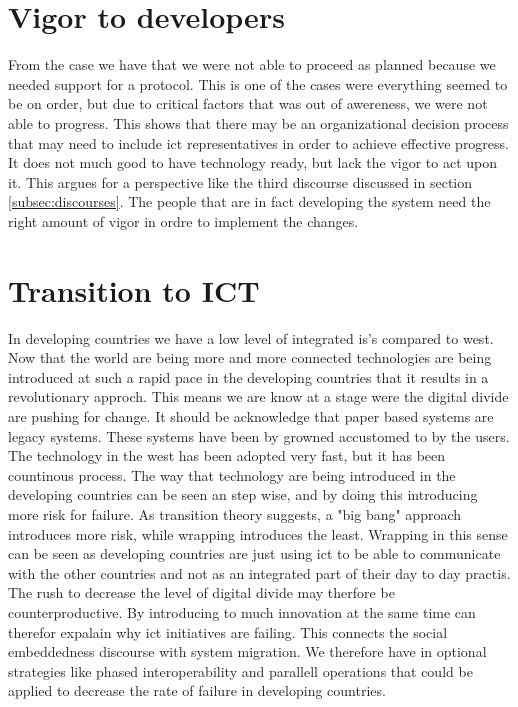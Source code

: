 \cite{internet:stats}
\cite{mobile:think}

\section{Vigor to developers}
From the case  we have that we were not able to proceed as planned because we needed support for a protocol.
This is one of the cases were everything seemed to be on order, but due to critical factors that was out of awereness, we were not able to progress. 
This shows that there may be an organizational decision process that may need to include \gls{ict} representatives in order to achieve effective progress. 
It does not much good to have technology ready, but lack the vigor to act upon it. 
This argues for a perspective like the third discourse discussed in section \ref{subsec:discourses}. 
The people that are in fact developing the system need the right amount of vigor in ordre to implement the changes.

\section{Transition to ICT}
In developing countries we have a low level of integrated \gls{is}'s compared to west.
Now that the world are being more and more connected technologies are being introduced at such a rapid pace in the developing countries that it results in a revolutionary approch.
This means we are know at a stage were the digital divide are pushing for change.
It should be acknowledge that paper based systems are legacy systems. 
These systems have been by growned accustomed to by the users. 
The technology in the west has been adopted very fast, but it has been countinous process. 
The way that technology are being introduced in the developing countries can be seen an step wise, and by doing this introducing more risk for failure. 
As transition theory suggests, a "big bang" approach introduces more risk, while wrapping introduces the least. 
Wrapping in this sense can be seen as developing countries are just using \gls{ict} to be able to communicate with the other countries and not as an integrated part of their day to day practis. 
The rush to decrease the level of digital divide may therfore be counterproductive. 
By introducing to much innovation at the same time can therefor expalain why \gls{ict} initiatives are failing.
This connects the social embeddedness discourse with system migration. 
We therefore have in optional strategies like phased interoperability and parallell operations that could be applied to decrease the rate of failure in developing countries. 


